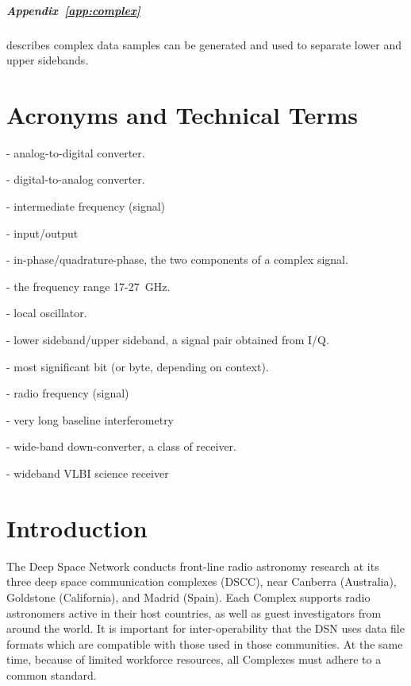 \documentclass[letterpaper,11pt]{book}
\begin{document}
\paragraph{Appendix~\ref{app:complex}} describes complex data samples can be
generated and used to separate lower and upper sidebands.

\tableofcontents
\listoffigures
{}

\chapter*{Acronyms and Technical Terms}

\begin{description}\itemsep0pt \parskip0pt 
  \item[ADC]- analog-to-digital converter.
  \item[DAC]- digital-to-analog converter.
  \item[IF]- intermediate frequency (signal) 
  \item[I/O]- input/output
  \item[I/Q]- in-phase/quadrature-phase, the two components of a complex signal.
  \item[K-band]- the frequency range 17-27~GHz.
  \item[LO]- local oscillator.
  \item[L/U]- lower sideband/upper sideband, a signal pair obtained from I/Q.
  \item[MSB]- most significant bit (or byte, depending on context).
  \item[RF]- radio frequency (signal)
  \item[VLBI]- very long baseline interferometry
  \item[WBDC]- wide-band down-converter, a class of receiver.
  \item[WVSR]- wideband VLBI science receiver
\end{description}

\mainmatter

\chapter{Introduction}\label{chap:intro}

The Deep Space Network conducts front-line radio astronomy research at its
three deep space communication complexes (DSCC), near Canberra (Australia),
Goldstone (California), and Madrid
(Spain).  Each Complex supports radio astronomers active in their host
countries, as well as guest investigators from around the world.  It is
important for inter-operability that the DSN uses data file formats which are
compatible with those used in those communities.  At the same time, because of
limited workforce resources, all Complexes must adhere to a common standard.
\end{document}

